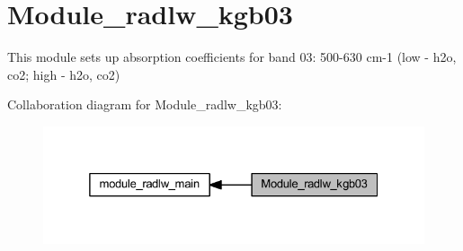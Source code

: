 \hypertarget{group__module__radlw__kgb03}{}\section{Module\+\_\+radlw\+\_\+kgb03}
\label{group__module__radlw__kgb03}


This module sets up absorption coefficients for band 03\+: 500-\/630 cm-\/1 (low -\/ h2o, co2; high -\/ h2o, co2)  


Collaboration diagram for Module\+\_\+radlw\+\_\+kgb03\+:\nopagebreak
\begin{figure}[H]
\begin{center}
\leavevmode
\includegraphics[width=325pt]{group__module__radlw__kgb03}
\end{center}
\end{figure}
